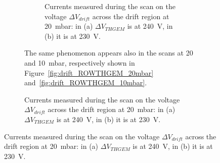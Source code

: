 \documentclass[a4paper, 11 pt]{article}
\newcommand{\Vthgem}{$\Delta V_{THGEM}$}
\newcommand{\Vdrift}{$ \Delta V_{drift}$}
\begin{document}
\begin{figure}[htbp]
\begin{figure}[htbp]
\begin{figure}[!htb]
	\centering
	\caption{Currents measured during the scan on the voltage \Vdrift{} across the drift region at 20~mbar: in (a) \Vthgem{} is at 240~V, in (b) it is at 230~V.}
	\label{fig:drift_ROWTHGEM_30mbar_both}
\end{figure}

The same phenomenon appears also in the scans at 20 and 10~mbar, respectively shown in Figure~\ref{fig:drift_ROWTHGEM_20mbar} and~\ref{fig:drift_ROWTHGEM_10mbar}.


\end{figure}
\end{figure}
\end{document}
